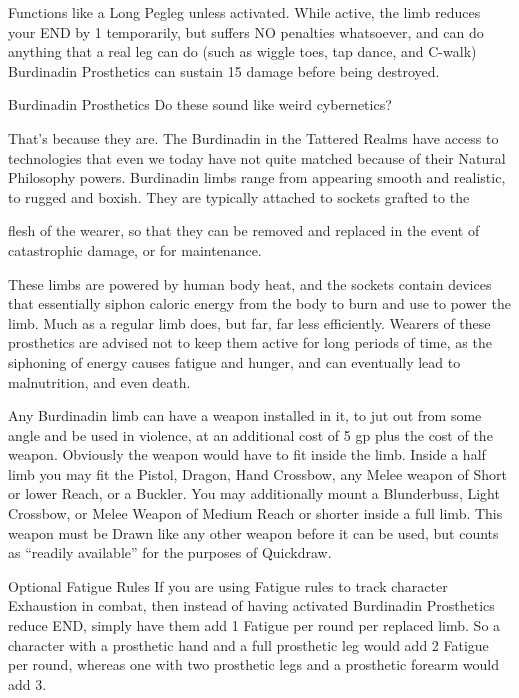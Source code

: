 \documentclass[oneside,11pt,english]{book}
\begin{document}
Functions like a Long Pegleg unless activated. While active, the limb 
reduces your END by 1 temporarily, but suffers NO penalties 
whatsoever, and can do anything that a real leg can do (such as wiggle 
toes, tap dance, and C-walk) Burdinadin Prosthetics can sustain 15 
damage before being destroyed. 

 

Burdinadin Prosthetics 
Do these sound like weird cybernetics? 

 

That’s because they are. The Burdinadin in the Tattered Realms have access to technologies that even we 
today have not quite matched because of their Natural Philosophy powers. Burdinadin limbs range from 
appearing smooth and realistic, to rugged and boxish. They are typically attached to sockets grafted to the 


flesh of the wearer, so that they can be removed and replaced in the event of catastrophic damage, or for 
maintenance. 

 

These limbs are powered by human body heat, and the sockets contain devices that essentially siphon 
caloric energy from the body to burn and use to power the limb. Much as a regular limb does, but far, far 
less efficiently. Wearers of these prosthetics are advised not to keep them active for long periods of time, 
as the siphoning of energy causes fatigue and hunger, and can eventually lead to malnutrition, and even 
death. 

 

Any Burdinadin limb can have a weapon installed in it, to jut out from some angle and be used in 
violence, at an additional cost of 5 gp plus the cost of the weapon. Obviously the weapon would have to 
fit inside the limb. Inside a half limb you may fit the Pistol, Dragon, Hand Crossbow, any Melee weapon 
of Short or lower Reach, or a Buckler. You may additionally mount a Blunderbuss, Light Crossbow, or 
Melee Weapon of Medium Reach or shorter inside a full limb. This weapon must be Drawn like any other 
weapon before it can be used, but counts as “readily available” for the purposes of Quickdraw. 

 

Optional Fatigue Rules 
If you are using Fatigue rules to track character Exhaustion in combat, then instead of having activated 
Burdinadin Prosthetics reduce END, simply have them add 1 Fatigue per round per replaced limb. So a 
character with a prosthetic hand and a full prosthetic leg would add 2 Fatigue per round, whereas one with 
two prosthetic legs and a prosthetic forearm would add 3. 
\end{document}
